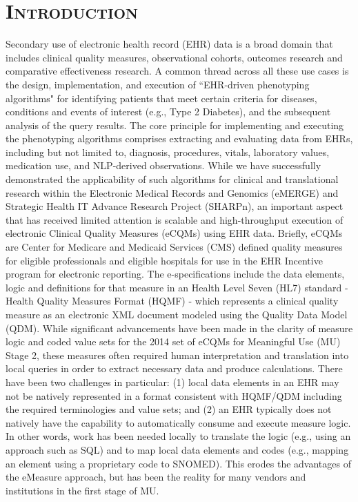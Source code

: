 \documentclass{amia}
\begin{document}
\section{\textsc{Introduction}}
Secondary use of electronic health record (EHR) data is a broad domain that includes clinical quality measures, observational cohorts, outcomes research and comparative effectiveness research. A common thread across all these use cases is the design, implementation, and execution of ``EHR-driven phenotyping algorithms" for identifying patients that meet certain criteria for diseases, conditions and events of interest (e.g., Type 2 Diabetes), and the subsequent analysis of the query results. The core principle for implementing and executing the phenotyping algorithms comprises extracting and evaluating data from EHRs, including but not limited to, diagnosis, procedures, vitals, laboratory values, medication use, and NLP-derived observations. While we have successfully demonstrated the applicability of such algorithms for clinical and translational research within the Electronic Medical Records and Genomics (eMERGE)\cite{gottesman2013electronic} and Strategic Health IT Advance Research Project (SHARPn)\cite{pathak2013normalization,rea2012building}, an important aspect that has received limited attention is scalable and high-throughput execution of electronic Clinical Quality Measures (eCQMs) using EHR data. Briefly, eCQMs are Center for Medicare and Medicaid Services (CMS) defined quality measures for eligible professionals and eligible hospitals for use in the EHR Incentive program for electronic reporting\cite{cqm_spec}. The e-specifications include the data elements, logic and definitions for that measure in an Health Level Seven (HL7) standard - Health Quality Measures Format (HQMF) - which represents a clinical quality measure as an electronic XML document modeled using the Quality Data Model (QDM). While significant advancements have been made in the clarity of measure logic and coded value sets for the 2014 set of eCQMs for Meaningful Use (MU) Stage 2, these measures often required human interpretation and translation into local queries in order to extract necessary data and produce calculations. There have been two challenges in particular: (1) local data elements in an EHR may not be natively represented in a format consistent with HQMF/QDM including the required terminologies and value sets; and (2) an EHR typically does not natively have the capability to automatically consume and execute measure logic. In other words, work has been needed locally to translate the logic (e.g., using an approach such as SQL) and to map local data elements and codes (e.g., mapping an element using a proprietary code to SNOMED). This erodes the advantages of the eMeasure approach, but has been the reality for many vendors and institutions in the first stage of MU\cite{fu2012impact}.
\end{document}
